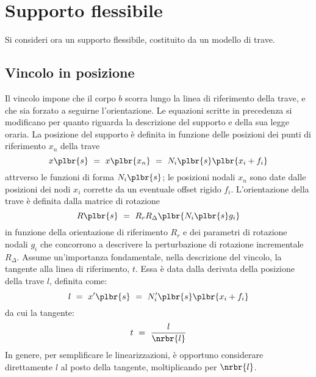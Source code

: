 \documentclass[12pt,dvips,fleqn,italian]{article}
\begin{document}
\section*{Supporto flessibile}
Si consideri ora un supporto flessibile, costituito da un modello di trave.

\subsection*{Vincolo in posizione}
Il vincolo impone che il corpo $b$ scorra lungo la linea di riferimento
della trave, e che sia forzato a seguirne l'orientazione.
Le equazioni scritte in precedenza si modificano per quanto riguarda la
descrizione del supporto e della sua legge oraria.
La posizione del supporto \`{e} definita in funzione delle posizioni
dei punti di riferimento $ x_n $ della trave 
\begin{displaymath}
    x\plbr{s} \ = \ x\plbr{x_n} \ = \ N_i\plbr{s}\plbr{x_i + f_i}
\end{displaymath}
attrverso le funzioni di forma $N_i\plbr{s}$; le posizioni nodali
$x_n$ sono date dalle posizioni dei nodi $x_i$ corrette 
da un eventuale offset rigido $f_i$.
L'orientazione della trave \`{e} definita dalla matrice di rotazione
\begin{displaymath}
    R\plbr{s} \ = \ R_r R_{\Delta}\plbr{ N_i\plbr{s} g_i }
\end{displaymath}
in funzione della orientazione di riferimento $R_r$ e dei parametri di
rotazione nodali $g_i$ che concorrono a descrivere la perturbazione di
rotazione incrementale $R_{\Delta}$.
Assume un'importanza fondamentale, nella descrizione del vincolo,
la tangente alla linea di riferimento, $ t $.
Essa \`e data dalla derivata della posizione della trave $ l $, definita
come:
\begin{displaymath}
    l \ = \ x'\plbr{s} \ = \ N'_i\plbr{s}\plbr{x_i + f_i}
\end{displaymath}
da cui la tangente:
\begin{displaymath}
    t \ = \ \frac{l}{\nrbr{l}}
\end{displaymath}
In genere, per semplificare le linearizzazioni, \`e opportuno considerare
direttamente $ l $ al posto della tangente, moltiplicando per
$ \nrbr{l} $.
\end{document}
